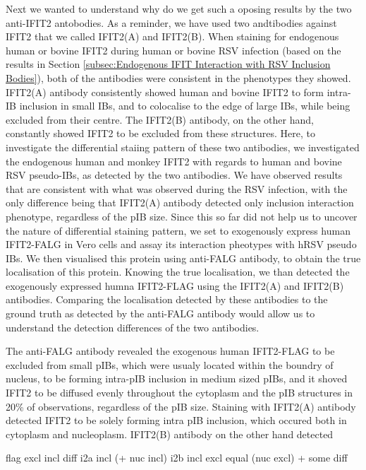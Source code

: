 Next we wanted to understand why do we get such a oposing results by the two anti-IFIT2 antobodies. As a reminder, we have used two andtibodies against IFIT2 that we called IFIT2(A) and IFIT2(B). When staining for endogenous human or bovine IFIT2 during human or bovine RSV infection (based on the results in Section \ref{subsec:Endogenous IFIT Interaction with RSV Inclusion Bodies}), both of the antibodies were consistent in the phenotypes they showed. IFIT2(A) antibody consistently showed human and bovine IFIT2 to form intra-IB inclusion in small IBs, and to colocalise to the edge of large IBs, while being excluded from their centre. The IFIT2(B) antibody, on the other hand, constantly showed IFIT2 to be excluded from these structures. Here, to investigate the differential staiing pattern of these two antibodies, we investigated the endogenous human and monkey IFIT2 with regards to human and bovine RSV pseudo-IBs, as detected by the two antibodies. We have observed results that are consistent with what was observed during the RSV infection, with the only difference being that IFIT2(A) antibody detected only inclusion interaction phenotype, regardless of the pIB size. Since this so far did not help us to uncover the nature of differential staining pattern, we set to exogenously express human IFIT2-FALG in Vero cells and assay its interaction pheotypes with hRSV pseudo IBs. We then visualised this protein using anti-FALG antibody, to obtain the true localisation of this protein. Knowing the true localisation, we than detected the exogenously expressed humna IFIT2-FLAG using the IFIT2(A) and IFIT2(B) antibodies. Comparing the localisation detected by these antibodies to the ground truth as detected by the anti-FALG antibody would allow us to understand the detection differences of the two antibodies.

The anti-FALG antibody revealed the exogenous human IFIT2-FLAG to be excluded from small pIBs, which were usualy located within the boundry of nucleus, to be forming intra-pIB inclusion in medium sized pIBs, and it shoved IFIT2 to be diffused evenly throughout the cytoplasm and the pIB structures in 20\% of observations, regardless of the pIB size. Staining with IFIT2(A) antibody detected IFIT2 to be solely forming intra pIB inclusion, which occured both in cytoplasm and nucleoplasm. IFIT2(B) antibody on the other hand detected 


flag excl incl diff
i2a incl (+ nuc incl)
i2b incl excl equal (nuc excl) + some diff

